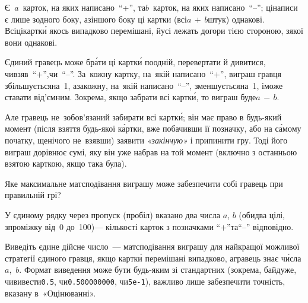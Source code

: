 
Є~$a$~карток, на яких написано~\mbox{``+''}, 
та\nolinebreak[3]
$b$~карток, на яких написано~\mbox{``–''};
ці\nolinebreak[3] написи є лише з\nolinebreak[3] одного боку, а\nolinebreak[3] з\nolinebreak[3] іншого боку ці картки (всі\nolinebreak[2] ${a\,{+}\,b}$\nolinebreak[2] штук) однакові.
Всі\nolinebreak[3] ці\nolinebreak[3] картк\'{и} якось випадково перемішані, й\nolinebreak[2] усі лежать догори тією стороною, з\nolinebreak[3] якої вони однакові.

Єдиний гравець може бр\'{а}ти ці картк\'{и} по\nolinebreak[3] одній, перевертати й дивитися, чи\nolinebreak[3] взяв~\mbox{``+''},\nolinebreak[2] чи~\mbox{``–''}.
За~кожну картку, на~якій написано~\mbox{``+''}, виграш гравця збільшується\nolinebreak[3] на~1,
а\nolinebreak[3] за\nolinebreak[3] кожну, на~якій написано~\mbox{``–''}, зменшується\nolinebreak[3] на~1, і\nolinebreak[3] може ставати від'ємним.
Зокрема, якщо забрати всі картк\'{и}, то виграш 
буде\nolinebreak[2] 
$a\,{-}\,b$.

Але гравець не~зобов'язаний забирати всі картк\'{и}; він має право в будь-який момент (після взяття будь-якої к\'{а}ртки, вже побачивши її позначку, або %
на с\'{а}мому початку, ще\nolinebreak[3] нічого не~взявши) заявити \textsl{«закінчую»} і припинити гру. Тоді його виграш дорівнює сумі, яку він уже набрав на той момент (включно з останньою взятою карткою, якщо така була).

Яке максимальне матсподівання виграшу може забезпечити собі гравець при правильній грі?


\InputFile
У єдиному рядку через пропуск (пробіл) вказано два числа $a$, $b$ (обидва цілі, з\nolinebreak[3] проміжку від~0 до~100)\nolinebreak[3] — кількості карток з позначками \mbox{``+''}\nolinebreak[3]
та\nolinebreak[3] \mbox{``–''} відповідно.

\OutputFile
Виведіть єдине дійсне число~--- матсподівання виграшу для найкращої можливої стратегії єдиного гравця, якщо картк\'{и} перемішані випадково, а\nolinebreak[3] гравець знає ч\'{и}с\-ла\nolinebreak[3] $a$,~$b$. Формат виведення може бути будь-яким зі стандартних (зокрема, байдуже, чи\nolinebreak[3] вивести\nolinebreak[3] \texttt{0.5}, чи\nolinebreak[3] \texttt{0.500000000}, чи\nolinebreak[3] \mbox{\texttt{5e-1}}), важливо лише забезпечити точність, вказану в~«Оцінюванні».

\Examples

